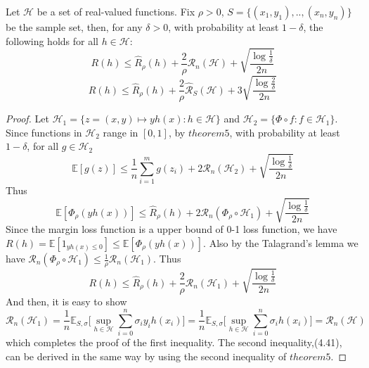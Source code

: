 \begin{theorem}
	Let $\mathcal{H}$ be a set of real-valued functions. Fix $\rho>0$, $S=\{(x_1,y_1),..,(x_n,y_n)\}$ be the sample set, then, for any $\delta>0$, with probability at least $1-\delta$, the following holds for all $h \in \mathcal{H}$:
	\begin{equation}
	R(h) \leq \hat{R}_{\rho}(h) + \frac{2}{\rho}\mathcal{R}_n(\mathcal{H}) + \sqrt{\frac{\log\frac{1}{\delta}}{2n}}
	\end{equation}
	\begin{equation}
	R(h) \leq \hat{R}_{\rho}(h) + \frac{2}{\rho}\hat{\mathcal{R}}_S(\mathcal{H}) + 3\sqrt{\frac{\log\frac{2}{\delta}}{2n}}
	\end{equation}
\end{theorem}
\begin{proof}
	Let $\mathcal{H}_1 = \{ z=(x,y) \mapsto yh(x) : h \in \mathcal{H} \}$ and $\mathcal{H}_2 = \{  \Phi \circ f : f \in \mathcal{H}_1 \}$. 
	Since functions in $\mathcal{H}_2$ range in $[0,1]$, by $theorem5$, with probability at least $1-\delta$, for all $g \in \mathcal{H}_2$
	\begin{equation}
	\mathbb{E}[g(z)] \leq \frac{1}{n}\sum_{i=1}^{m}g(z_i) + 2\mathcal{R}_n(\mathcal{H}_2) +\sqrt{\frac{\log\frac{1}{\delta}}{2n}}	
	\end{equation}
	Thus
	\begin{equation}
	\mathbb{E}[\Phi_{\rho}(yh(x))] \leq \hat{R}_{\rho}(h) + 2\mathcal{R}_n(\Phi_{\rho} \circ \mathcal{H}_1) +\sqrt{\frac{\log\frac{1}{\delta}}{2n}}
	\end{equation}
	Since the margin loss function is a upper bound of 0-1 loss function, we have 
	$R(h) = \mathbb{E}[1_{yh(x) \leq 0}] \leq \mathbb{E}[\Phi_{\rho}(yh(x))]$. 
	Also by the Talagrand's lemma we have $\mathcal{R}_n(\Phi_{\rho} \circ \mathcal{H}_1) \leq \frac{1}{\rho} \mathcal{R}_n(\mathcal{H}_1)$. Thus
	\begin{equation}
	R(h) \leq \hat{R}_{\rho}(h) + \frac{2}{\rho}\mathcal{R}_n(\mathcal{H}_1) +\sqrt{\frac{\log\frac{1}{\delta}}{2n}}
	\end{equation}
	And then, it is easy to show
	\begin{equation}
	\mathcal{R}_n(\mathcal{H}_1) =\frac{1}{n}\mathbb{E}_{S,\sigma}\bigg[\sup_{h \in \mathcal{H}}\sum_{i=0}^{n}\sigma_iy_ih(x_i)\bigg] = \frac{1}{n}\mathbb{E}_{S,\sigma}\bigg[\sup_{h \in \mathcal{H}}\sum_{i=0}^{n}\sigma_ih(x_i)\bigg] =  \mathcal{R}_n(\mathcal{H})
	\end{equation}
	which completes the proof of the first inequality. 
	The second inequality,(4.41), can be derived in the same way by using the second inequality of $theorem5$.
\end{proof}


